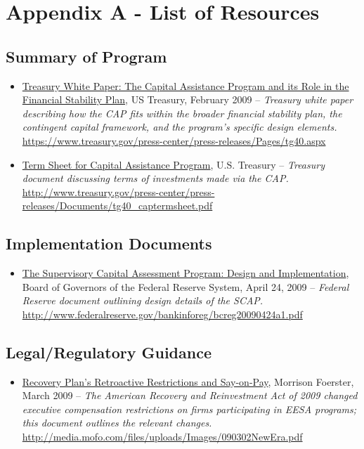 \documentclass[12pt]{article}
\begin{document}
\nocite{*}


\section{Appendix A - List of Resources}

\subsection{Summary of Program}

\begin{itemize}

\item
\ul{Treasury White Paper: The Capital Assistance Program and its Role in the Financial Stability Plan}, US Treasury, February 2009 -- \emph{Treasury white paper describing how the CAP fits within the broader financial stability plan, the contingent capital framework, and the program's specific design elements.} \url{https://www.treasury.gov/press-center/press-releases/Pages/tg40.aspx}
\item
\ul{Term
  Sheet for Capital Assistance Program}, U.S. Treasury -- \emph{Treasury
  document discussing terms of investments made via the CAP.} \url{http://www.treasury.gov/press-center/press-releases/Documents/tg40_captermsheet.pdf}
\end{itemize}

\subsection{Implementation Documents}
\begin{itemize}
\item
\ul{The
  Supervisory Capital Assessment Program: Design and Implementation},
  Board of Governors of the Federal Reserve System, April 24, 2009 -- \emph{Federal Reserve document outlining design details of the SCAP.} \url{http://www.federalreserve.gov/bankinforeg/bcreg20090424a1.pdf}
\end{itemize}

\subsection{Legal/Regulatory Guidance}

\begin{itemize}
\item
\ul{Recovery Plan's Retroactive Restrictions and Say-on-Pay}, Morrison Foerster, March 2009 -- \emph{The American Recovery and Reinvestment Act of 2009 changed executive compensation restrictions on firms participating in EESA programs; this document outlines the relevant changes.} \url{http://media.mofo.com/files/uploads/Images/090302NewEra.pdf}
\end{itemize}
\end{document}
